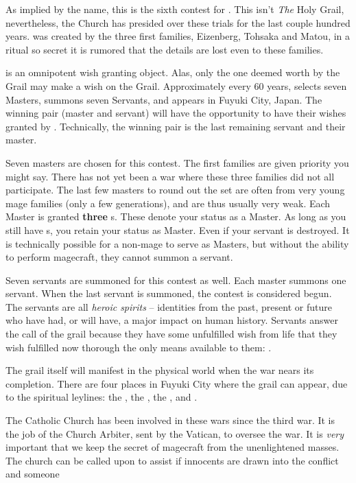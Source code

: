 \documentclass[blue]{FateDarkDawn}
\begin{document}
\name{\bHGW{}}


As implied by the name, this is the sixth contest for \iGrail{\MYname{}}. This isn't \emph{The} Holy Grail, nevertheless, the Church has presided over these trials for the last couple hundred years. \iGrail{\MYname{}} was created by the three first families, Eizenberg, Tohsaka and Matou, in a ritual so secret it is rumored that the details are lost even to these families.

\iGrail{\MYname{}} is an omnipotent wish granting object. Alas, only the one deemed worth by the Grail may make a wish on the Grail. Approximately every 60 years, \iGrail{\MYname{}} selects seven Masters, summons seven Servants, and appears in Fuyuki City, Japan. The winning pair (master and servant) will have the opportunity to have their wishes granted by \iGrail{\MYname{}}. Technically, the winning pair is the last remaining servant and their master.

Seven masters are chosen for this contest. The first families are given priority you might say. There has not yet been a war where these three families did not all participate. The last few masters to round out the set are often from very young mage families (only a few generations), and are thus usually very weak. Each Master is granted {\bf three} \iCommand{\MYname}s. These denote your status as a Master. As long as you still have \iCommand{\MYname}s, you retain your status as Master. Even if your servant is destroyed. It is technically possible for a non-mage to serve as Masters, but without the ability to perform magecraft, they cannot summon a servant.

Seven servants are summoned for this contest as well. Each master summons one servant. When the last servant is summoned, the contest is considered begun. The servants are all \emph{heroic spirits} -- identities from the past, present or future who have had, or will have, a major impact on human history. Servants answer the call of the grail because they have some unfulfilled wish from life that they wish fulfilled now thorough the only means available to them: \iGrail{\MYname{}}.

The grail itself will manifest in the physical world when the war nears its completion. There are four places in Fuyuki City where the grail can appear, due to the spiritual leylines: the \pChurch{}, the \pTEstate{}, the \pConvention{}, and \pTemple{}.

The Catholic Church has been involved in these wars since the third war. It is the job of the Church Arbiter, sent by the Vatican, to oversee the war. It is \emph{very} important that we keep the secret of magecraft from the unenlightened masses. The church can be called upon to assist if innocents are drawn into the conflict and someone 
\end{document}
